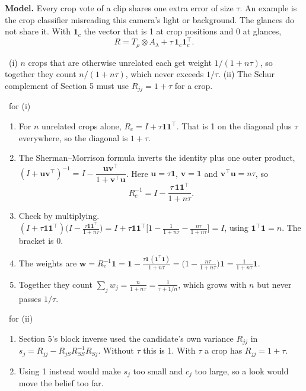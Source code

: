 \documentclass[11pt]{article}
\newcommand{\one}{\mathbf{1}}
\newcommand{\Want}{\par\medskip\noindent{\sffamily\bfseries\color{headblue}What to show.}\ }
\newcommand{\Steps}{\par\smallskip\noindent{\sffamily\bfseries\color{headblue}Steps.}\par}
\newenvironment{steps}{\begin{enumerate}[label=\textbf{\arabic*.},leftmargin=2em,itemsep=6pt]}{\end{enumerate}}
\begin{document}
\textbf{Model.} Every crop vote of a clip shares one extra error of size $\tau$. An example is the crop classifier misreading this camera's light or background. The glances do not share it. With $\one_c$ the vector that is 1 at crop positions and 0 at glances,
\[ R=T_\rho\otimes A_\lambda+\tau\,\one_c\one_c^\top. \]

\Want (i) $n$ crops that are otherwise unrelated each get weight $1/(1+n\tau)$, so together they count $n/(1+n\tau)$, which never exceeds $1/\tau$. (ii) The Schur complement of Section 5 must use $R_{jj}=1+\tau$ for a crop.

\Steps\ for (i)
\begin{steps}
  \item For $n$ unrelated crops alone, $R_c=I+\tau\one\one^\top$. That is 1 on the diagonal plus $\tau$ everywhere, so the diagonal is $1+\tau$.
  \item The Sherman--Morrison formula inverts the identity plus one outer product, $(I+\bm u\bm v^\top)^{-1}=I-\dfrac{\bm u\bm v^\top}{1+\bm v^\top\bm u}$. Here $\bm u=\tau\one$, $\bm v=\one$ and $\bm v^\top\bm u=n\tau$, so
  \[ R_c^{-1}=I-\frac{\tau\,\one\one^\top}{1+n\tau}. \]
  \item Check by multiplying. $(I+\tau\one\one^\top)\big(I-\frac{\tau\one\one^\top}{1+n\tau}\big)=I+\tau\one\one^\top\Big[1-\frac{1}{1+n\tau}-\frac{n\tau}{1+n\tau}\Big]=I$, using $\one^\top\one=n$. The bracket is 0.
  \item The weights are $\bm w=R_c^{-1}\one=\one-\frac{\tau\one\,(\one^\top\one)}{1+n\tau}=\Big(1-\frac{n\tau}{1+n\tau}\Big)\one=\frac{1}{1+n\tau}\one$.
  \item Together they count $\sum_jw_j=\frac{n}{1+n\tau}=\frac{1}{\tau+1/n}$, which grows with $n$ but never passes $1/\tau$.
\end{steps}

\Steps\ for (ii)
\begin{steps}
  \item Section 5's block inverse used the candidate's own variance $R_{jj}$ in $s_j=R_{jj}-R_{jS}R_{SS}^{-1}R_{Sj}$. Without $\tau$ this is 1. With $\tau$ a crop has $R_{jj}=1+\tau$.
  \item Using 1 instead would make $s_j$ too small and $c_j$ too large, so a look would move the belief too far.
\end{steps}
\end{document}
